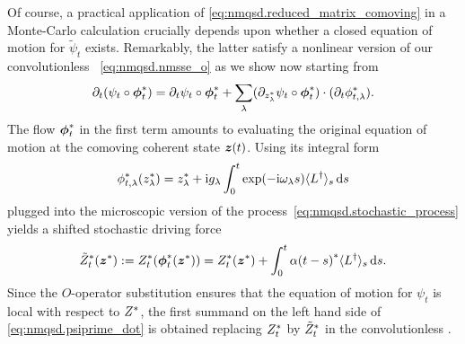 Of course, a practical application of \autoref{eq:nmqsd.reduced_matrix_comoving} in a Monte-Carlo calculation crucially depends upon whether a closed equation of motion for $\tilde\psi_t$ exists.
Remarkably, the latter satisfy a nonlinear version of our convolutionless \NMSSE~\ref{eq:nmqsd.nmsse_o} as we show now starting from
\begin{equation}
  \partial_t (\psi_t \circ {\boldsymbol{\phi}}^*_t) = \partial_t\psi_t \circ {\boldsymbol{\phi}}^*_t + \sum_\lambda (\partial_{{z}^*_\lambda} \psi_t \circ {\boldsymbol{\phi}}^*_t) \cdot (\partial_t {\phi}^*_{t, \lambda}).
  \label{eq:nmqsd.psiprime_dot}
\end{equation}
The flow ${\boldsymbol{\phi}}^*_t$ in the first term amounts to evaluating the original equation of motion at the comoving coherent state $\boldsymbol{z}(t)$.
Using its integral form
\begin{equation}
  \ccphitla(\cc z_\lambda) = \cc z_\lambda + \ii g_\lambda \int_0^t \exp(-\ii \omega_\lambda s) \qmean{\adj L}_s \dd s
  \label{eq:nmqsd.comoving_flow}
\end{equation}
plugged into the microscopic version of the process~\ref{eq:nmqsd.stochastic_process} yields a shifted stochastic driving force
\begin{equation}
  {\tilde Z}^*_t({\boldsymbol{z}}^*) := {Z}^*_t({\boldsymbol{\phi}}^*_t({\boldsymbol{z}}^*)) = {Z}^*_t({\boldsymbol{z}}^*) + \int_0^t {\alpha(t-s)}^* \langle L^\dagger \rangle_s \, \mathrm{d} s.
  \label{eq:stochastic_process_shiften}
\end{equation}
Since the $O$-operator substitution ensures that the equation of motion for $\psi_t$ is local with respect to ${Z}^*$, the first summand on the left hand side of \autoref{eq:nmqsd.psiprime_dot} is obtained replacing ${Z}^*_t$ by ${\tilde Z}^*_t$ in the convolutionless \NMSSE.

